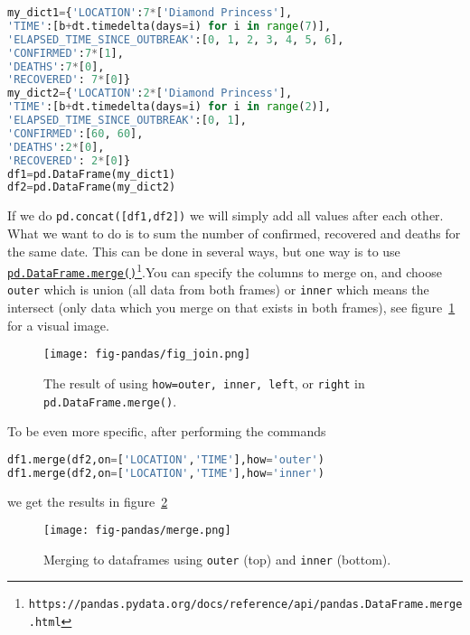 \documentclass[graybox,sectrefs,envcountresetchap,open=right,final]{svmonodo}
\begin{document}
\begin{lstlisting}[language=python,style=blue1bar]
my_dict1={'LOCATION':7*['Diamond Princess'], 
'TIME':[b+dt.timedelta(days=i) for i in range(7)],
'ELAPSED_TIME_SINCE_OUTBREAK':[0, 1, 2, 3, 4, 5, 6],
'CONFIRMED':7*[1],
'DEATHS':7*[0],
'RECOVERED': 7*[0]}
my_dict2={'LOCATION':2*['Diamond Princess'], 
'TIME':[b+dt.timedelta(days=i) for i in range(2)],
'ELAPSED_TIME_SINCE_OUTBREAK':[0, 1],
'CONFIRMED':[60, 60],
'DEATHS':2*[0],
'RECOVERED': 2*[0]}
df1=pd.DataFrame(my_dict1)
df2=pd.DataFrame(my_dict2)

\end{lstlisting}

If we do \texttt{pd.concat([df1,df2])} we will simply add all values after each other. What we want to do is to sum the number of confirmed, recovered and deaths for the same date. This can be done in several ways, but one way is to use \href{{https://pandas.pydata.org/docs/reference/api/pandas.DataFrame.merge.html}}{\nolinkurl{pd.DataFrame.merge()}\footnote{\texttt{https://pandas.pydata.org/docs/reference/api/pandas.DataFrame.merge.html}}}.You can specify the columns to merge on, and choose \texttt{outer} which is union (all data from both frames) or \texttt{inner} which means the intersect (only data which you merge on that exists in both frames), see figure~\ref{fig:pandas:join} for a visual image.

\begin{figure}[!ht]  %
  \centerline{\texttt{[image: fig-pandas/fig\_join.png]}}
  \caption{
  The result of using \texttt{how=outer, inner, left}, or \texttt{right} in \texttt{pd.DataFrame.merge()}. \label{fig:pandas:join}
  }
\end{figure}

To be even more specific, after performing the commands



\begin{lstlisting}[language=python,style=blue1bar]
df1.merge(df2,on=['LOCATION','TIME'],how='outer')
df1.merge(df2,on=['LOCATION','TIME'],how='inner')

\end{lstlisting}


we get the results in figure~\ref{fig:pd:merge} 

\begin{figure}[!ht]  %
  \centerline{\texttt{[image: fig-pandas/merge.png]}}
  \caption{
  Merging to dataframes using \texttt{outer} (top) and \texttt{inner} (bottom). \label{fig:pd:merge}
  }
\end{figure}
\end{document}
